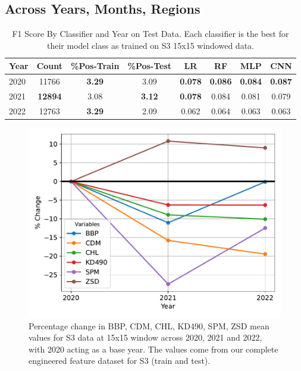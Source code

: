 \documentclass[a4paper,11pt]{report}
\begin{document}
\subsection{Across Years, Months, Regions}
    \begin{table}[H]
        \caption{F1 Score By Classifier and Year on Test Data. Each classifier is the best for their model class as trained on S3 15x15 windowed data.}
        \label{tab:metrics_across_years}
        \centering
        \begin{tabular}{lccccccc}
        \toprule
        \textbf{Year} & \textbf{Count} & \textbf{\%Pos-Train} & \textbf{\%Pos-Test} & \textbf{LR} & \textbf{RF} & \textbf{MLP} & \textbf{CNN} \\
        \midrule
        2020 & 11766 & \textbf{3.29} & 3.09 & \textbf{0.078} & \textbf{0.086} & \textbf{0.084} & \textbf{0.087} \\
        2021 & \textbf{12894} & 3.08 & \textbf{3.12} & \textbf{0.078} & 0.084 & 0.081 & 0.079  \\ 
        2022 & 12763 & \textbf{3.29} & 2.09 & 0.062 & 0.064 & 0.063 & 0.063 \\ \bottomrule
        \end{tabular}
    \end{table}

    \begin{figure}[H]
        \begin{center}
        \includegraphics[height=0.2\textheight]{images/percent_change_by_year.pdf}
        \caption{Percentage change in BBP, CDM, CHL, KD490, SPM, ZSD mean values for S3 data at 15x15 window across 2020, 2021 and 2022, with 2020 acting as a base year. The values come from our complete engineered feature dataset for S3 (train and test).}
        \label{fig:pc_by_year}
        \end{center}
    \end{figure}
    
\end{document}
